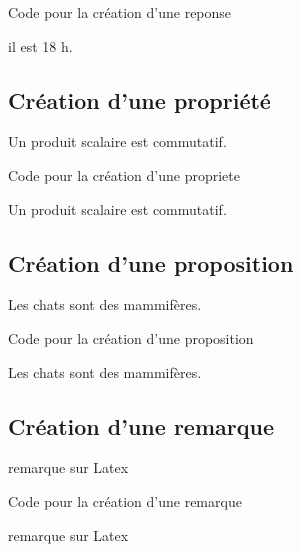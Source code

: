\begin{Latex}{Code pour la création d'une reponse}
\begin{reponse}
    il est 18 h.
\end{reponse}
\end{Latex}

\subsection{Création d'une propriété}

\begin{propriete}
    Un produit scalaire est commutatif.
\end{propriete}

\begin{Latex}{Code pour la création d'une propriete}
\begin{propriete}
    Un produit scalaire est commutatif.
\end{propriete}
\end{Latex}

\subsection{Création d'une proposition}

\begin{proposition}
    Les chats sont des mammifères.
\end{proposition}

\begin{Latex}{Code pour la création d'une proposition}
\begin{proposition}
    Les chats sont des mammifères.
\end{proposition}
\end{Latex}

\subsection{Création d'une remarque}

\begin{remarque}
remarque sur Latex
\end{remarque}

\begin{Latex}{Code pour la création d'une remarque}
\begin{remarque}
remarque sur Latex
\end{remarque}
\end{Latex}

